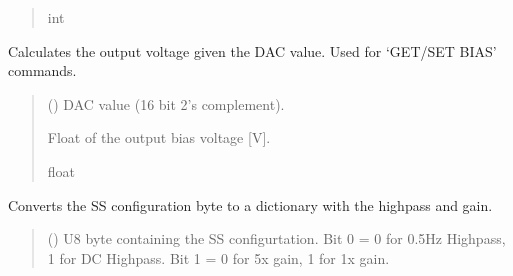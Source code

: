 \documentclass[letterpaper,10pt,english]{sphinxmanual}
\begin{document}
\begin{fulllineitems}
\begin{fulllineitems}
\begin{quote}
\begin{description}
\sphinxAtStartPar
int

\end{description}\end{quote}

\end{fulllineitems}


\begin{fulllineitems}
\label{\detokenize{PodDevice_8401HR:PodDevice_8401HR.POD_8401HR.CalculateBiasDAC_GetVout}}
\pysigstartsignatures
{}
\pysigstopsignatures
\sphinxAtStartPar
Calculates the output voltage given the DAC value. Used for ‘GET/SET BIAS’ commands.
\begin{quote}\begin{description}
\sphinxAtStartPar
{} () \textendash{} DAC value (16 bit 2’s complement).

\sphinxAtStartPar
Float of the output bias voltage {[}V{]}.

\sphinxAtStartPar
float

\end{description}\end{quote}

\end{fulllineitems}


\begin{fulllineitems}
\label{\detokenize{PodDevice_8401HR:PodDevice_8401HR.POD_8401HR.DecodeSSConfigBitmask}}
\pysigstartsignatures
{}
\pysigstopsignatures
\sphinxAtStartPar
Converts the SS configuration byte to a dictionary with the high\sphinxhyphen{}pass and gain.
\begin{quote}\begin{description}
\sphinxAtStartPar
{} () \textendash{} U8 byte containing the SS configurtation. Bit 0 = 0 for 0.5Hz Highpass,                 1 for DC Highpass. Bit 1 = 0 for 5x gain, 1 for 1x gain.


\end{description}
\end{quote}
\end{fulllineitems}
\end{fulllineitems}
\end{document}
